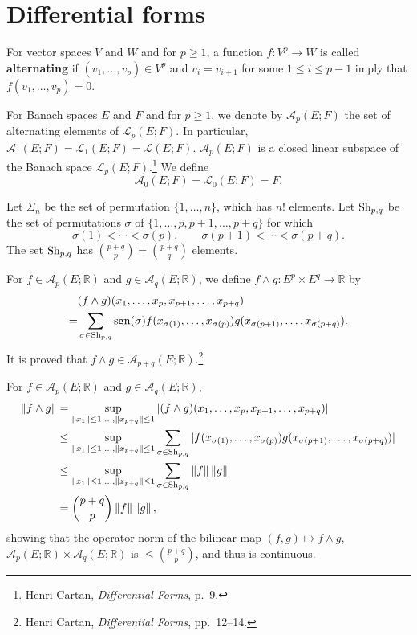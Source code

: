 \documentclass{article}
\newcommand{\Sh}{\ensuremath\mathrm{Sh}}
\newcommand{\sgn}{\ensuremath\mathrm{sgn}}
\newcommand{\norm}[1]{\left\Vert #1 \right\Vert}
\theoremstyle{definition}
\theoremstyle{definition}
\begin{document}
\section{Differential forms}
For vector spaces $V$ and $W$ and for $p \geq 1$, a function $f:V^p \to W$ is called
\textbf{alternating} if 
$(v_1,\ldots,v_p) \in V^p$ and
$v_i=v_{i+1}$ for some $1 \leq i \leq p-1$ 
imply that $f(v_1,\ldots,v_p)=0$.

For Banach spaces $E$ and $F$ and for $p \geq 1$,
we denote by $\mathscr{A}_p(E;F)$ the set of alternating elements of
$\mathscr{L}_p(E;F)$. In particular, $\mathscr{A}_1(E;F)=\mathscr{L}_1(E;F)=
\mathscr{L}(E;F)$. $\mathscr{A}_p(E;F)$ is a closed linear subspace
of the Banach space $\mathscr{L}_p(E;F)$.\footnote{Henri Cartan,
{\em Differential Forms}, p.~9.}
We define
\[
\mathscr{A}_0(E;F)=\mathscr{L}_0(E;F)=F.
\] 

Let $\Sigma_n$ be the set of permutation $\{1,\ldots,n\}$, which has $n!$ elements.
Let $\Sh_{p,q}$ be the set of permutations $\sigma$ of $\{1,\ldots,p,p+1,\ldots,p+q\}$ for which
\[
\sigma(1)<\cdots<\sigma(p), \qquad \sigma(p+1)<\cdots<\sigma(p+q).
\]
The set $\Sh_{p,q}$ has $\binom{p+q}{p}=\binom{p+q}{q}$ elements. 

For $f \in \mathscr{A}_p(E;\mathbb{R})$ and $g \in \mathscr{A}_q(E;\mathbb{R})$,
we define $f \wedge g:E^p \times E^q \to \mathbb{R}$ by
\[
\begin{split}
&(f \wedge g)(x_1,\ldots,x_p,x_{p+1},\ldots,x_{p+q})\\
=&\sum_{\sigma \in \Sh_{p,q}} \sgn(\sigma) f(x_{\sigma(1)},\ldots,x_{\sigma(p)})
g(x_{\sigma(p+1)},\ldots,x_{\sigma(p+q)}).
\end{split}
\]
It is proved that $f \wedge g \in \mathscr{A}_{p+q}(E;\mathbb{R})$.\footnote{Henri Cartan,
{\em Differential Forms}, pp.~12--14.}

For $f \in \mathscr{A}_p(E;\mathbb{R})$ and
$g \in \mathscr{A}_q(E;\mathbb{R})$,
\begin{align*}
\norm{f \wedge g}&=\sup_{\norm{x_1} \leq 1,\ldots, \norm{x_{p+q}} \leq 1}
|(f \wedge g)(x_1,\ldots,x_p,x_{p+1},\ldots,x_{p+q})|\\
&\leq \sup_{\norm{x_1} \leq 1,\ldots, 
\norm{x_{p+q}} \leq 1}
\sum_{\sigma \in \Sh_{p,q}} |f(x_{\sigma(1)},\ldots,x_{\sigma(p)})
g(x_{\sigma(p+1)},\ldots,x_{\sigma(p+q)})|\\
&\leq  \sup_{\norm{x_1} \leq 1,\ldots, \norm{x_{p+q}} \leq 1}
\sum_{\sigma \in \Sh_{p,q}} \norm{f} \norm{g}\\
&=\binom{p+q}{p} \norm{f} \norm{g},
\end{align*}
showing that the operator norm of the bilinear map $(f,g) \mapsto f \wedge g$,
$\mathscr{A}_p(E;\mathbb{R}) \times \mathscr{A}_q(E;\mathbb{R})$ is
$\leq \binom{p+q}{p}$, and thus is continuous.
\end{document}
